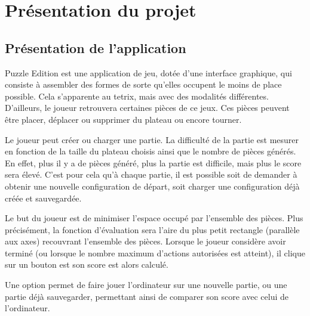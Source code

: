 \chapter{Présentation du projet}

	\section{Présentation de l'application}

    Puzzle Edition est une application de jeu, dotée d'une interface graphique, qui consiste à assembler des formes de sorte qu'elles occupent le moins de place possible. Cela s'apparente au tetrix, mais avec des modalités différentes. D'ailleurs, le joueur retrouvera certaines pièces de ce jeux. Ces pièces peuvent être placer, déplacer ou supprimer du plateau ou encore tourner.

    Le joueur peut créer ou charger une partie. La difficulté de la partie est mesurer en fonction de la taille du plateau choisis ainsi que le nombre de pièces générés. En effet, plus il y a de pièces généré, plus la partie est difficile, mais plus le score sera élevé. C'est pour cela qu'à chaque partie, il est possible soit de demander à obtenir une nouvelle configuration de départ, soit charger une configuration déjà créée et sauvegardée.

    Le but du joueur est de minimiser l'espace occupé par l'ensemble des pièces. Plus précisément, la fonction d'évaluation sera l'aire du plus petit rectangle (parallèle aux axes) recouvrant l'ensemble des pièces. Lorsque le joueur considère avoir terminé (ou lorsque le nombre maximum d'actions autorisées est atteint), il clique sur un bouton est son score est alors calculé.

    Une option permet de faire jouer l'ordinateur sur une nouvelle partie, ou une partie déjà sauvegarder, permettant ainsi de comparer son score avec celui de l'ordinateur.

